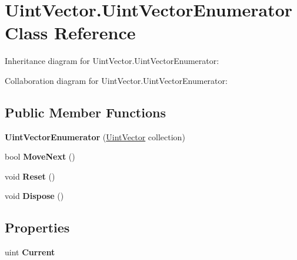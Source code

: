 \hypertarget{class_uint_vector_1_1_uint_vector_enumerator}{\section{Uint\+Vector.\+Uint\+Vector\+Enumerator Class Reference}
\label{class_uint_vector_1_1_uint_vector_enumerator}
}


Inheritance diagram for Uint\+Vector.\+Uint\+Vector\+Enumerator\+:


Collaboration diagram for Uint\+Vector.\+Uint\+Vector\+Enumerator\+:
\subsection*{Public Member Functions}
\begin{DoxyCompactItemize}
\item 
\hypertarget{class_uint_vector_1_1_uint_vector_enumerator_aad7b4f89bd0d1806ae51826ee362b341}{{\bfseries Uint\+Vector\+Enumerator} (\hyperlink{class_uint_vector}{Uint\+Vector} collection)}\label{class_uint_vector_1_1_uint_vector_enumerator_aad7b4f89bd0d1806ae51826ee362b341}

\item 
\hypertarget{class_uint_vector_1_1_uint_vector_enumerator_a3ad5fce9145d05904de360b29ec5ece4}{bool {\bfseries Move\+Next} ()}\label{class_uint_vector_1_1_uint_vector_enumerator_a3ad5fce9145d05904de360b29ec5ece4}

\item 
\hypertarget{class_uint_vector_1_1_uint_vector_enumerator_a9e280ff3c91b017b4a3ee2a32c2e5082}{void {\bfseries Reset} ()}\label{class_uint_vector_1_1_uint_vector_enumerator_a9e280ff3c91b017b4a3ee2a32c2e5082}

\item 
\hypertarget{class_uint_vector_1_1_uint_vector_enumerator_a03d54e047aa344c6f24e44dd30c395c1}{void {\bfseries Dispose} ()}\label{class_uint_vector_1_1_uint_vector_enumerator_a03d54e047aa344c6f24e44dd30c395c1}

\end{DoxyCompactItemize}
\subsection*{Properties}
\begin{DoxyCompactItemize}
\item 
\hypertarget{class_uint_vector_1_1_uint_vector_enumerator_a1ed8d457d916f353c915d5d727fda97c}{uint {\bfseries Current}}\label{class_uint_vector_1_1_uint_vector_enumerator_a1ed8d457d916f353c915d5d727fda97c}

\end{DoxyCompactItemize}


